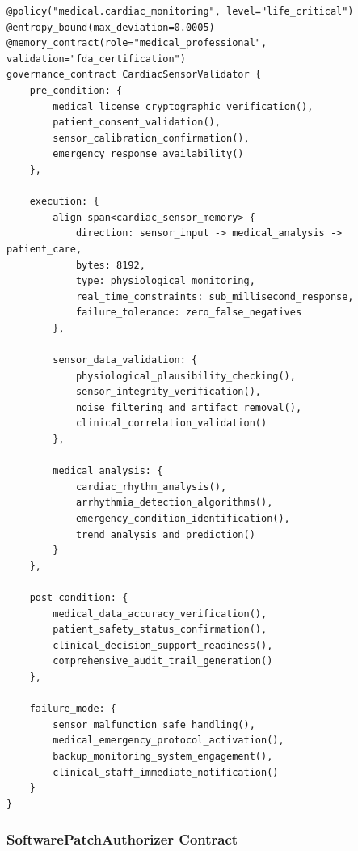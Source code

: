 \documentclass[11pt,letterpaper]{article}
\begin{document}
\begin{lstlisting}[language=rift, caption=Cardiac Sensor Validation Contract Implementation]
@policy("medical.cardiac_monitoring", level="life_critical")
@entropy_bound(max_deviation=0.0005)
@memory_contract(role="medical_professional", validation="fda_certification")
governance_contract CardiacSensorValidator {
    pre_condition: {
        medical_license_cryptographic_verification(),
        patient_consent_validation(),
        sensor_calibration_confirmation(),
        emergency_response_availability()
    },
    
    execution: {
        align span<cardiac_sensor_memory> {
            direction: sensor_input -> medical_analysis -> patient_care,
            bytes: 8192,
            type: physiological_monitoring,
            real_time_constraints: sub_millisecond_response,
            failure_tolerance: zero_false_negatives
        },
        
        sensor_data_validation: {
            physiological_plausibility_checking(),
            sensor_integrity_verification(),
            noise_filtering_and_artifact_removal(),
            clinical_correlation_validation()
        },
        
        medical_analysis: {
            cardiac_rhythm_analysis(),
            arrhythmia_detection_algorithms(),
            emergency_condition_identification(),
            trend_analysis_and_prediction()
        }
    },
    
    post_condition: {
        medical_data_accuracy_verification(),
        patient_safety_status_confirmation(),
        clinical_decision_support_readiness(),
        comprehensive_audit_trail_generation()
    },
    
    failure_mode: {
        sensor_malfunction_safe_handling(),
        medical_emergency_protocol_activation(),
        backup_monitoring_system_engagement(),
        clinical_staff_immediate_notification()
    }
}
\end{lstlisting}

\subsubsection{SoftwarePatchAuthorizer Contract}
\end{document}
